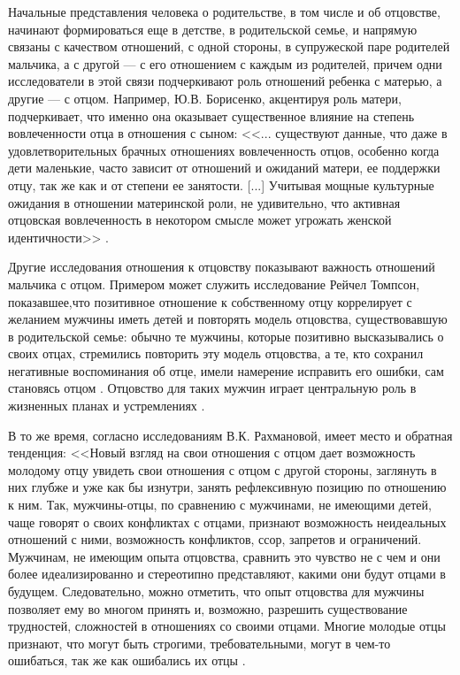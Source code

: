 \documentclass{../../common/thesisbyxetex}
\begin{document}
Начальные представления человека о родительстве, в том числе и об отцовстве, начинают формироваться 
еще в детстве, в родительской семье, и напрямую связаны с качеством отношений, с одной стороны, в 
супружеской паре родителей мальчика, а с другой --- с его отношением с каждым из родителей, причем 
одни исследователи в этой связи подчеркивают роль отношений ребенка с матерью, а другие --- с 
отцом. Например, Ю.В. Борисенко, акцентируя роль матери, подчеркивает, что именно она оказывает 
существенное влияние на степень вовлеченности отца в отношения с сыном: <<... существуют 
данные, что даже в удовлетворительных брачных отношениях вовлеченность отцов, особенно когда дети 
маленькие, часто зависит от отношений и ожиданий матери, ее поддержки отцу, так же как и от степени 
ее занятости. [...]  Учитывая мощные культурные ожидания в отношении материнской роли, не 
удивительно, что активная отцовская вовлеченность в некотором смысле может угрожать женской 
идентичности>> \cite[115]{psyot}.

Другие исследования отношения к отцовству показывают важность отношений мальчика с 
отцом. Примером может служить исследование Рейчел Томпсон, показавшее,что позитивное отношение к 
собственному отцу коррелирует с желанием мужчины иметь детей и повторять модель отцовства, 
существовавшую в родительской семье: обычно те мужчины, которые позитивно высказывались о 
своих отцах, стремились повторить эту модель отцовства, а те, кто сохранил негативные 
воспоминания об отце, имели намерение исправить его ошибки, сам становясь отцом  \cite[161]{imaf}.  
Отцовство для таких мужчин играет центральную роль в жизненных 
планах и устремлениях \cite{imaf}. 

В то же время, согласно исследованиям В.К. Рахмановой, имеет место и обратная тенденция: <<Новый 
взгляд на свои отношения с отцом дает возможность молодому отцу увидеть свои отношения с отцом с 
другой стороны, заглянуть в них глубже и уже как бы изнутри, занять рефлексивную позицию по 
отношению 
к ним. Так, мужчины-отцы, по сравнению с мужчинами, не имеющими детей, чаще говорят о своих 
конфликтах с отцами, признают возможность неидеальных отношений с ними, возможность конфликтов, 
ссор, запретов и ограничений. Мужчинам, не имеющим опыта отцовства, сравнить это чувство не с чем и 
они более идеализированно и стереотипно представляют, какими они будут отцами в будущем. 
Следовательно, можно отметить, что опыт отцовства для мужчины позволяет ему во многом принять и, 
возможно, разрешить существование трудностей, сложностей в отношениях со своими отцами. Многие 
молодые отцы признают, что могут быть строгими, требовательными, могут в чем-то ошибаться, так же 
как 
ошибались их отцы \cite[54]{relot}.
\end{document}
